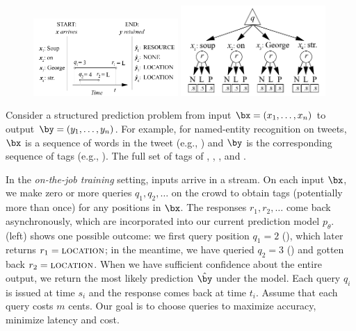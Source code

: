 \begin{figure}[t]
  \begin{centering}
  \includegraphics[width=0.49\textwidth]{figures/piano-roll.pdf}
  \hfill
 \includegraphics[width=0.49\textwidth,height=0.23\textheight,keepaspectratio]{figures/single-move.pdf}
  \end{centering}
  \caption{
  }
\label{fig:piano-roll}
\end{figure}

Consider a structured prediction problem from input $\bx = (x_1, \dots, x_n)$ to output $\by = (y_1, \dots, y_n)$.
For example, for named-entity recognition on tweets,
$\bx$ is a sequence of words in the tweet (e.g., )
and $\by$ is the corresponding sequence of tags (e.g., \scnone{} \scloc{} \scloc{}).
The full set of tags of \scper{}, \scloc{}, \scres{}, and \scnone{}.

In the \emph{on-the-job training} setting, inputs arrive in a stream.
On each input $\bx$,
we make zero or more queries $q_1, q_2, \dots$ on the crowd to obtain tags
(potentially more than once)
for any positions in $\bx$.
The responses $r_1, r_2, \dots$ come back asynchronously,
which are incorporated into our current prediction model $p_\theta$.
(left) shows one possible outcome:
we first query position $q_1 = 2$ (), which later returns $r_1 = \textsc{location}$;
in the meantime, we have queried $q_2=3$ () and gotten back $r_2 = \textsc{location}$.
When we have sufficient confidence about the entire output,
we return the most likely prediction $\hat \by$ under the model.
Each query $q_i$ is issued at time $s_i$ and the response comes back at time $t_i$.
Assume that each query costs $m$ cents.
Our goal is to choose queries to maximize accuracy, minimize latency and cost.

